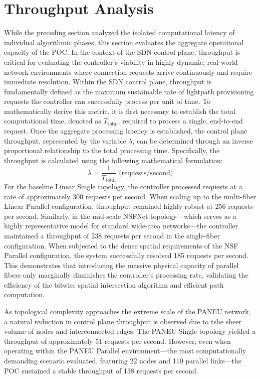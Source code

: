 \documentclass[12pt, a4paper, twoside, openright]{report}
\begin{document}
\section{Throughput Analysis}
While the preceding section analyzed the isolated computational latency of individual algorithmic phases, this section evaluates the aggregate operational capacity of the POC. In the context of the SDN control plane, throughput is critical for evaluating the controller's viability in highly dynamic, real-world network environments where connection requests arrive continuously and require immediate resolution. Within the SDN control plane, throughput is fundamentally defined as the maximum sustainable rate of lightpath provisioning requests the controller can successfully process per unit of time. To mathematically derive this metric, it is first necessary to establish the total computational time, denoted as $T_{\text{total}}$, required to process a single, end-to-end request. Once the aggregate processing latency is established, the control plane throughput, represented by the variable $\lambda$, can be determined through an inverse proportional relationship to the total processing time. Specifically, the throughput is calculated using the following mathematical formulation:
\[
    \lambda=\frac{1}{T_{\text{total}}} \text{ (requests/second)}
\]
For the baseline Linear Single topology, the controller processed requests at a rate of approximately 300 requests per second. When scaling up to the multi-fiber Linear Parallel configuration, throughput remained highly robust at 256 requests per second. Similarly, in the mid-scale NSFNet topology—which serves as a highly representative model for standard wide-area networks—the controller maintained a throughput of 238 requests per second in the single-fiber configuration. When subjected to the dense spatial requirements of the NSF Parallel configuration, the system successfully resolved 185 requests per second. This demonstrates that introducing the massive physical capacity of parallel fibers only marginally diminishes the controller's processing rate, validating the efficiency of the bitwise spatial intersection algorithm and efficient path computation.

As topological complexity approaches the extreme scale of the PANEU network, a natural reduction in control plane throughput is observed due to tshe sheer volume of nodes and interconnected edges. The PANEU Single topology yielded a throughput of approximately 51 requests per second. However, even when operating within the PANEU Parallel environment—the most computationally demanding scenario evaluated, featuring 22 nodes and 110 parallel links—the POC sustained a stable throughput of 138 requests per second.
\end{document}
